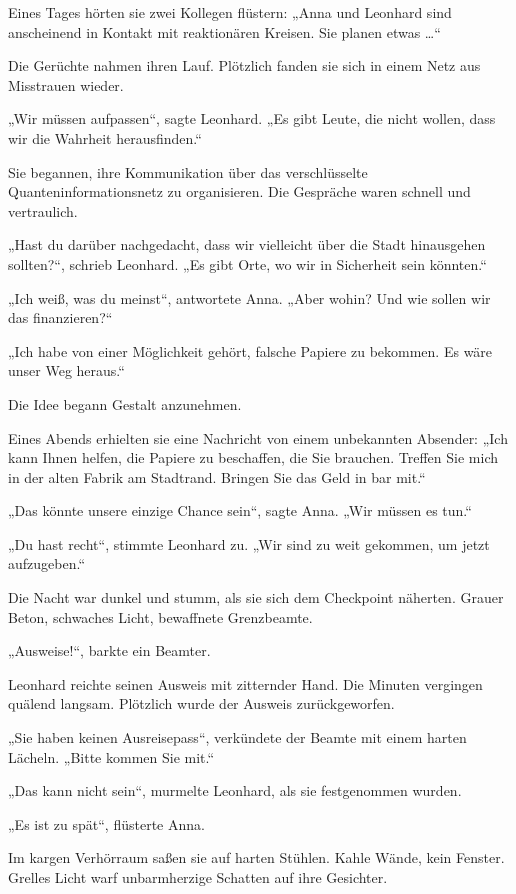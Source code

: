 \documentclass[
]{article}
\begin{document}
Eines Tages hörten sie zwei Kollegen flüstern: „Anna und Leonhard sind anscheinend in Kontakt mit reaktionären Kreisen. Sie planen etwas \ldots``

Die Gerüchte nahmen ihren Lauf. Plötzlich fanden sie sich in einem Netz aus Misstrauen wieder.

„Wir müssen aufpassen``, sagte Leonhard. „Es gibt Leute, die nicht wollen, dass wir die Wahrheit herausfinden.``

Sie begannen, ihre Kommunikation über das verschlüsselte Quanteninformationsnetz zu organisieren. Die Gespräche waren schnell und vertraulich.

„Hast du darüber nachgedacht, dass wir vielleicht über die Stadt hinausgehen sollten?{\kern0pt}``, schrieb Leonhard. „Es gibt Orte, wo wir in Sicherheit sein könnten.``

„Ich weiß, was du meinst``, antwortete Anna. „Aber wohin? Und wie sollen wir das finanzieren?{\kern0pt}``

„Ich habe von einer Möglichkeit gehört, falsche Papiere zu bekommen. Es wäre unser Weg heraus.``

Die Idee begann Gestalt anzunehmen.

Eines Abends erhielten sie eine Nachricht von einem unbekannten Absender: „Ich kann Ihnen helfen, die Papiere zu beschaffen, die Sie brauchen. Treffen Sie mich in der alten Fabrik am Stadtrand. Bringen Sie das Geld in bar mit.``

„Das könnte unsere einzige Chance sein``, sagte Anna. „Wir müssen es tun.``

„Du hast recht``, stimmte Leonhard zu. „Wir sind zu weit gekommen, um jetzt aufzugeben.``

Die Nacht war dunkel und stumm, als sie sich dem Checkpoint näherten. Grauer Beton, schwaches Licht, bewaffnete Grenzbeamte.

„Ausweise!{\kern0pt}``, barkte ein Beamter.

Leonhard reichte seinen Ausweis mit zitternder Hand. Die Minuten vergingen quälend langsam. Plötzlich wurde der Ausweis zurückgeworfen.

„Sie haben keinen Ausreisepass``, verkündete der Beamte mit einem harten Lächeln. „Bitte kommen Sie mit.``

„Das kann nicht sein``, murmelte Leonhard, als sie festgenommen wurden.

„Es ist zu spät``, flüsterte Anna.

Im kargen Verhörraum saßen sie auf harten Stühlen. Kahle Wände, kein Fenster. Grelles Licht warf unbarmherzige Schatten auf ihre Gesichter.
\end{document}
